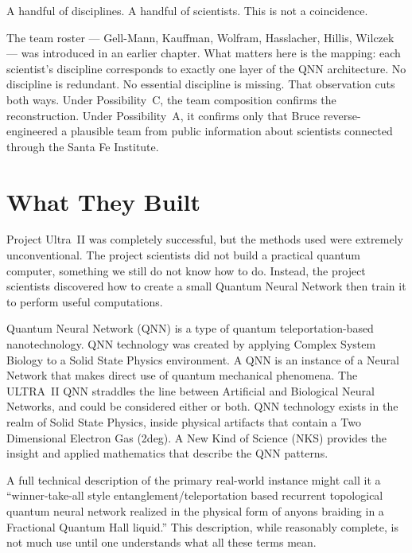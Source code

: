 A handful of disciplines. A handful of scientists. This is not a coincidence.

The team roster --- Gell-Mann, Kauffman, Wolfram, Hasslacher, Hillis, Wilczek --- was introduced in an earlier chapter. What matters here is the mapping: each scientist's discipline corresponds to exactly one layer of the QNN architecture. No discipline is redundant. No essential discipline is missing. That observation cuts both ways. Under Possibility~C, the team composition confirms the reconstruction. Under Possibility~A, it confirms only that Bruce reverse-engineered a plausible team from public information about scientists connected through the Santa Fe Institute.

\section*{What They Built}
\label{pos20:what-they-built}


Project Ultra~II was completely successful, but the methods used were extremely unconventional. The project scientists did not build a practical quantum computer, something we still do not know how to do. Instead, the project scientists discovered how to create a small Quantum Neural Network then train it to perform useful computations.

Quantum Neural Network (QNN) is a type of quantum teleportation-based nanotechnology. QNN technology was created by applying Complex System Biology to a Solid State Physics environment. A QNN is an instance of a Neural Network that makes direct use of quantum mechanical phenomena. The ULTRA~II QNN straddles the line between Artificial and Biological Neural Networks, and could be considered either or both. QNN technology exists in the realm of Solid State Physics, inside physical artifacts that contain a Two Dimensional Electron Gas (\gls{2deg}). A New Kind of Science (NKS) provides the insight and applied mathematics that describe the QNN patterns.

A full technical description of the primary real-world instance might call it a ``winner-take-all style entanglement/teleportation based recurrent topological quantum neural network realized in the physical form of anyons braiding in a Fractional Quantum Hall liquid.'' This description, while reasonably complete, is not much use until one understands what all these terms mean.

